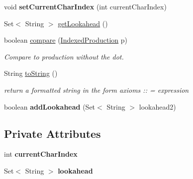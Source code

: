 \begin{DoxyCompactItemize}
\item 
\hypertarget{classcontext_free_1_1scanner_1_1_indexed_production_a043e92b74dced5730930c6d492c36a3a}{void {\bfseries set\-Current\-Char\-Index} (int current\-Char\-Index)}\label{classcontext_free_1_1scanner_1_1_indexed_production_a043e92b74dced5730930c6d492c36a3a}

\item 
Set$<$ String $>$ \hyperlink{classcontext_free_1_1scanner_1_1_indexed_production_a45b191078f89a67427a2593b67ae4f1e}{get\-Lookahead} ()
\item 
boolean \hyperlink{classcontext_free_1_1scanner_1_1_indexed_production_a8346f298c18af8ce2f48442a12b3a123}{compare} (\hyperlink{classcontext_free_1_1scanner_1_1_indexed_production}{Indexed\-Production} p)
\begin{DoxyCompactList}\small\item\em Compare to production without the dot. \end{DoxyCompactList}\item 
\hypertarget{classcontext_free_1_1scanner_1_1_indexed_production_a445e1ce3ced2a3b4e1157bd682f973a6}{String \hyperlink{classcontext_free_1_1scanner_1_1_indexed_production_a445e1ce3ced2a3b4e1157bd682f973a6}{to\-String} ()}\label{classcontext_free_1_1scanner_1_1_indexed_production_a445e1ce3ced2a3b4e1157bd682f973a6}

\begin{DoxyCompactList}\small\item\em return a formatted string in the form axioms \-:\-: = expression \end{DoxyCompactList}\item 
\hypertarget{classcontext_free_1_1scanner_1_1_indexed_production_a1a37f6b6ece07637677a52d970bed542}{boolean {\bfseries add\-Lookahead} (Set$<$ String $>$ lookahead2)}\label{classcontext_free_1_1scanner_1_1_indexed_production_a1a37f6b6ece07637677a52d970bed542}

\end{DoxyCompactItemize}
\subsection*{Private Attributes}
\begin{DoxyCompactItemize}
\item 
\hypertarget{classcontext_free_1_1scanner_1_1_indexed_production_a8a1fec5bbcbe0f41511ef9ac6ae4ad7e}{int {\bfseries current\-Char\-Index}}\label{classcontext_free_1_1scanner_1_1_indexed_production_a8a1fec5bbcbe0f41511ef9ac6ae4ad7e}

\item 
\hypertarget{classcontext_free_1_1scanner_1_1_indexed_production_a8a766e2b079a0f160e3703ceff3bcef9}{Set$<$ String $>$ {\bfseries lookahead}}\label{classcontext_free_1_1scanner_1_1_indexed_production_a8a766e2b079a0f160e3703ceff3bcef9}

\end{DoxyCompactItemize}


